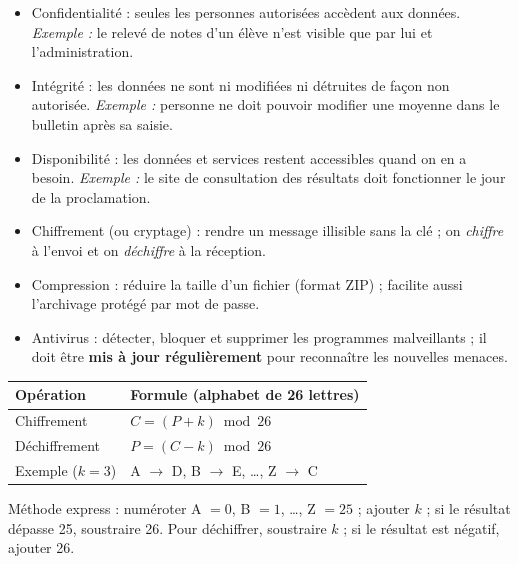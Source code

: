 \documentclass[11pt]{article}
\newcommand{\cle}[1]{{\popxbold\color{popdark}#1}}
\begin{document}
\begin{aretenir}
\begin{itemize}
  \item \cle{Confidentialité} : seules les personnes autorisées accèdent aux données. \emph{Exemple :} le relevé de notes d'un élève n'est visible que par lui et l'administration.
  \item \cle{Intégrité} : les données ne sont ni modifiées ni détruites de façon non autorisée. \emph{Exemple :} personne ne doit pouvoir modifier une moyenne dans le bulletin après sa saisie.
  \item \cle{Disponibilité} : les données et services restent accessibles quand on en a besoin. \emph{Exemple :} le site de consultation des résultats doit fonctionner le jour de la proclamation.
\end{itemize}
\end{aretenir}

\begin{aretenir}
\begin{itemize}
  \item \cle{Chiffrement} (ou cryptage) : rendre un message illisible sans la clé ; on \emph{chiffre} à l'envoi et on \emph{déchiffre} à la réception.
  \item \cle{Compression} : réduire la taille d'un fichier (format ZIP) ; facilite aussi l'archivage protégé par mot de passe.
  \item \cle{Antivirus} : détecter, bloquer et supprimer les programmes malveillants ; il doit être \textbf{mis à jour régulièrement} pour reconnaître les nouvelles menaces.
\end{itemize}
\end{aretenir}

\begin{aretenir}
\begin{center}
\begin{tabularx}{\linewidth}{|l|X|}
\hline
\rowcolor{popblueL} \textbf{Opération} & \textbf{Formule (alphabet de 26 lettres)} \\
\hline
Chiffrement & $C = (P + k) \bmod 26$ \\
\hline
Déchiffrement & $P = (C - k) \bmod 26$ \\
\hline
Exemple ($k=3$) & A $\to$ D, B $\to$ E, \dots, Z $\to$ C \\
\hline
\end{tabularx}
\end{center}
Méthode express : numéroter A $=0$, B $=1$, \dots, Z $=25$ ; ajouter $k$ ; si le résultat dépasse 25, soustraire 26. Pour déchiffrer, soustraire $k$ ; si le résultat est négatif, ajouter 26.
\end{aretenir}
\end{document}

